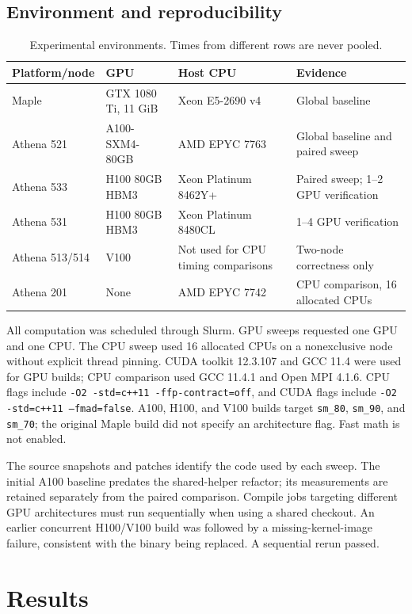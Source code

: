 \documentclass[conference]{IEEEtran}
\begin{document}
\subsection{Environment and reproducibility}
\begin{table}[t]\centering
\caption{Experimental environments. Times from different rows are never pooled.}\label{tab:hardware}
\small\begin{tabular}{llll}\toprule
Platform/node & GPU & Host CPU & Evidence\\\midrule
Maple & GTX 1080 Ti, 11 GiB & Xeon E5-2690 v4 & Global baseline\\
Athena 521 & A100-SXM4-80GB & AMD EPYC 7763 & Global baseline and paired sweep\\
Athena 533 & H100 80GB HBM3 & Xeon Platinum 8462Y+ & Paired sweep; 1--2 GPU verification\\
Athena 531 & H100 80GB HBM3 & Xeon Platinum 8480CL & 1--4 GPU verification\\
Athena 513/514 & V100 & Not used for CPU timing comparisons & Two-node correctness only\\
Athena 201 & None & AMD EPYC 7742 & CPU comparison, 16 allocated CPUs\\\bottomrule
\end{tabular}\end{table}
All computation was scheduled through Slurm. GPU sweeps requested one GPU and one CPU. The CPU sweep used 16 allocated CPUs on a nonexclusive node without explicit thread pinning. CUDA toolkit 12.3.107 and GCC 11.4 were used for GPU builds; CPU comparison used GCC 11.4.1 and Open MPI 4.1.6. CPU flags include \texttt{-O2 -std=c++11 -ffp-contract=off}, and CUDA flags include \texttt{-O2 -std=c++11 --fmad=false}. A100, H100, and V100 builds target \texttt{sm\_80}, \texttt{sm\_90}, and \texttt{sm\_70}; the original Maple build did not specify an architecture flag. Fast math is not enabled.

The source snapshots and patches identify the code used by each sweep. The initial A100 baseline predates the shared-helper refactor; its measurements are retained separately from the paired comparison. Compile jobs targeting different GPU architectures must run sequentially when using a shared checkout. An earlier concurrent H100/V100 build was followed by a missing-kernel-image failure, consistent with the binary being replaced. A sequential rerun passed.

\section{Results}
\end{document}
